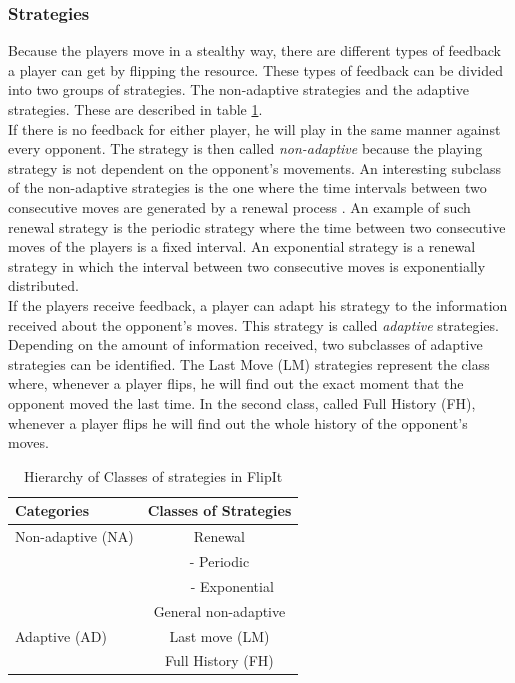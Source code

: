 \subsubsection{Strategies}
Because the players move in a stealthy way, there are different types of feedback a player can get by flipping the resource. These types of feedback can be divided into two groups of strategies. The non-adaptive strategies and the adaptive strategies. These are described in table \ref{table:Strategies}.\\

If there is no feedback for either player, he will play in the same manner against every opponent. The strategy is then called \textit{non-adaptive} because the playing strategy is not dependent on the opponent's movements. An interesting subclass of the non-adaptive strategies is the one where the time intervals between two consecutive moves are generated by a renewal process . An example of such renewal strategy is the periodic strategy where the time between two consecutive moves of the players is a fixed interval. An exponential strategy is a renewal strategy in which the interval between two consecutive moves is exponentially distributed. \\

If the players receive feedback, a player can adapt his strategy to the information received about the opponent's moves. This strategy is called \textit{adaptive} strategies. Depending on the amount of information received, two subclasses of adaptive strategies can be identified. The Last Move (LM) strategies represent the class where, whenever a player flips, he will find out the exact moment that the opponent moved the last time. In the second class, called Full History (FH), whenever a player flips he will find out the whole history of the opponent's moves. \\


 \begin{table}
 \centering
 \begin{tabular}{ l | c  }
  \textbf{Categories} & \textbf{Classes of Strategies} \\
  \hline Non-adaptive (NA) & Renewal \\
  & - Periodic \\
  & ~~~ - Exponential \\
  & General non-adaptive \\
  \hline Adaptive (AD) & Last move (LM) \\
  & Full History (FH) \\  
\end{tabular}
 \caption{Hierarchy of Classes of strategies in FlipIt}
 \label{table:Strategies}
 \end{table}

